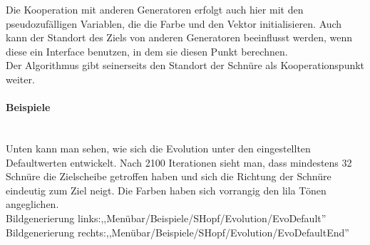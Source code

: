 \documentclass[../mciAusarbeitung.tex]{subfiles}
\begin{document}
		Die Kooperation mit anderen Generatoren erfolgt auch hier mit den pseudozufälligen Variablen, die die Farbe und den Vektor initialisieren. Auch kann der Standort des Ziels von anderen Generatoren beeinflusst werden, wenn diese ein Interface benutzen, in dem sie diesen Punkt berechnen.\\
		Der Algorithmus gibt seinerseits den Standort der Schnüre als Kooperationspunkt weiter.\\
		
		\paragraph{Beispiele}$~$\\
		Unten kann man sehen, wie sich die Evolution unter den eingestellten Defaultwerten entwickelt. Nach 2100 Iterationen sieht man, dass mindestens 32 Schnüre die Zielscheibe getroffen haben und sich die Richtung der Schnüre eindeutig zum Ziel neigt. Die Farben haben sich vorrangig den lila Tönen angeglichen.\\
		Bildgenerierung links:,,Menübar/Beispiele/SHopf/Evolution/EvoDefault''\\
		Bildgenerierung rechts:,,Menübar/Beispiele/SHopf/Evolution/EvoDefaultEnd''\\
\end{document}
